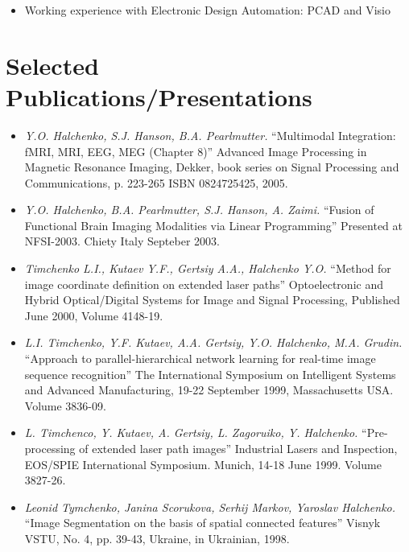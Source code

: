 \documentclass[10pt,overlapped,line]{res}
\newcommand{\mtitle}[1]{``#1''}
\newcommand{\mauthors}[1]{ \textit{#1.}}
\newcommand{\mwhere}[1]{#1.}
\begin{document}
\begin{resume}
\begin{description}
\begin{itemize}
      \item Working experience with Electronic Design Automation: PCAD and
        Visio
      \end{itemize}
  \end{description}

 \section{Selected Publications/Presentations}

 \begin{itemize}

  \item
    \mauthors{Y.O. Halchenko, S.J. Hanson, B.A. Pearlmutter}
    \mtitle{Multimodal Integration: fMRI, MRI, EEG, MEG (Chapter 8)}
    \mwhere{Advanced Image Processing in Magnetic Resonance Imaging,
      Dekker, book series on Signal Processing and Communications, p. 223-265
      ISBN 0824725425, 2005}

  \item
     \mauthors{Y.O. Halchenko, B.A. Pearlmutter, S.J. Hanson, A. Zaimi}
     \mtitle{Fusion of Functional Brain Imaging Modalities via Linear Programming}
     \mwhere{Presented at NFSI-2003. Chiety Italy Septeber 2003}

  \item
     \mauthors{Timchenko L.I., Kutaev Y.F., Gertsiy A.A., Halchenko Y.O}
     \mtitle{Method for image coordinate definition on extended laser paths}
     \mwhere{Optoelectronic and Hybrid Optical/Digital Systems for Image and Signal Processing, Published June 2000,  Volume 4148-19}

  \item
     \mauthors{L.I. Timchenko, Y.F. Kutaev, A.A. Gertsiy, Y.O. Halchenko,
     M.A. Grudin}
     \mtitle{Approach to parallel-hierarchical network learning for real-time image sequence recognition}
     \mwhere{The International Symposium on Intelligent Systems and Advanced Manufacturing, 19-22 September 1999, Massachusetts USA. Volume 3836-09}

   \item
     \mauthors{L. Timchenco, Y. Kutaev, A. Gertsiy, L. Zagoruiko, Y. Halchenko}
     \mtitle{Pre-processing of extended laser path images}
     \mwhere{Industrial Lasers and Inspection, EOS/SPIE International Symposium. Munich, 14-18 June 1999. Volume 3827-26}

   \item
     \mauthors{Leonid Tymchenko, Janina Scorukova, Serhij Markov, Yaroslav Halchenko}
     \mtitle{Image Segmentation on the basis of spatial connected features}
     \mwhere{Visnyk VSTU, No. 4, pp. 39-43, Ukraine, in Ukrainian, 1998}


\end{itemize}
\end{resume}
\end{document}
